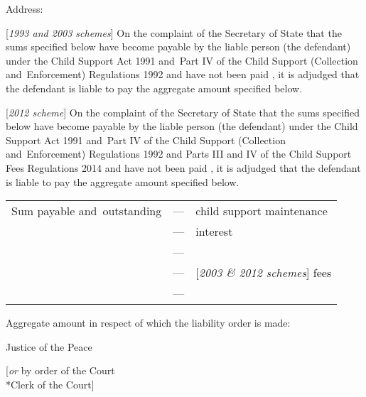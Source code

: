 \documentclass[12pt,a4paper]{article}
\begin{document}
Address:

\medskip

[\emph{1993 and 2003 schemes}] On the complaint of the Secretary of State 
that the sums specified below 
have become payable by the liable person (the defendant)  %
under the Child Support Act 1991 and~Part IV of the Child Support (Collection and~Enforcement) Regulations 1992 and 
have not been paid%
, it is adjudged that the defendant is liable to pay the aggregate amount specified below.

[\emph{2012 scheme}] On the complaint of the Secretary of State 
that the sums specified below 
have become payable by the liable person (the defendant)  %
under the Child Support Act 1991 and~Part IV of the Child Support (Collection and~Enforcement) Regulations 1992 
and Parts III and IV of the Child Support Fees Regulations 2014  %
and 
have not been paid%
, it is adjudged that the defendant is liable to pay the aggregate amount specified below.

\medskip

\noindent
\begin{tabulary}{0.9\linewidth}{lJJ}
Sum payable and~outstanding \hspace{0.075\linewidth} &  --- & child support maintenance\\
&--- & interest\\
&--- & \\
&--- & [\emph{2003 \& 2012 schemes}] fees\\
& --- & \\
\end{tabulary}

\medskip

Aggregate amount in respect of which the liability order is made:

\medskip

{\raggedleft Justice of the Peace

\medskip

[\emph{or} by order of the Court\\*Clerk of the Court]

}
\end{document}
